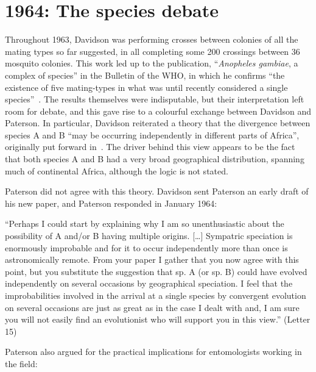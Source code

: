 \documentclass[a4paper,11pt,abstracton,hidelinks]{scrartcl}
\begin{document}
\section{1964: The species debate}\label{sec:1964}


Throughout 1963, Davidson was performing crosses between colonies of all the mating types so far suggested, in all completing some 200 crossings between 36 mosquito colonies.
%
This work led up to the publication, ``\textit{Anopheles gambiae}, a complex of species'' in the Bulletin of the WHO, in which he confirms ``the existence of five mating-types in what was until recently considered a single species''~\parencite{Davidson1964}.
%
The results themselves were indisputable, but their interpretation left room for debate, and this gave rise to a colourful exchange between Davidson and Paterson.
In particular, Davidson reiterated a theory that the divergence between species A and B ``may be occurring independently in different parts of Africa'', originally put forward in~\textcite{Davidson1962a}.
%
The driver behind this view appears to be the fact that both species A and B had a very broad geographical distribution, spanning much of continental Africa, although the logic is not stated.


Paterson did not agree with this theory.
%
Davidson sent Paterson an early draft of his new paper, and Paterson responded in January 1964:


\begin{displayquote}
``Perhaps I could start by explaining why I am so unenthusiastic about the possibility of A and/or B having multiple origins. [\ldots] Sympatric speciation is enormously improbable and for it to occur independently more than once is astronomically remote. From your paper I gather that you now agree with this point, but you substitute the suggestion that sp. A (or sp. B) could have evolved independently on several occasions by geographical speciation. I feel that the improbabilities involved in the arrival at a single species by convergent evolution on several occasions are just as great as in the case I dealt with and, I am sure you will not easily find an evolutionist who will support you in this view.'' (Letter 15)
\end{displayquote}


Paterson also argued for the practical implications for entomologists working in the field:
\end{document}
